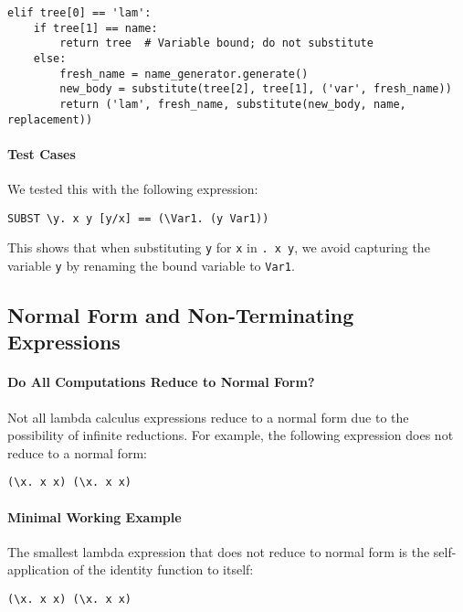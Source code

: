 \begin{verbatim}
elif tree[0] == 'lam':
    if tree[1] == name:
        return tree  # Variable bound; do not substitute
    else:
        fresh_name = name_generator.generate()
        new_body = substitute(tree[2], tree[1], ('var', fresh_name))
        return ('lam', fresh_name, substitute(new_body, name, replacement))
\end{verbatim}

\paragraph{Test Cases}

We tested this with the following expression:

\begin{verbatim}
SUBST \y. x y [y/x] == (\Var1. (y Var1))
\end{verbatim}

This shows that when substituting \texttt{y} for \texttt{x} in \texttt{\y. x y}, we avoid capturing the variable \texttt{y} by renaming the bound variable to \texttt{Var1}.

\subsection{Normal Form and Non-Terminating Expressions}

\paragraph{Do All Computations Reduce to Normal Form?}

Not all lambda calculus expressions reduce to a normal form due to the possibility of infinite reductions. For example, the following expression does not reduce to a normal form:

\begin{verbatim}
(\x. x x) (\x. x x)
\end{verbatim}

\paragraph{Minimal Working Example}

The smallest lambda expression that does not reduce to normal form is the self-application of the identity function to itself:

\begin{verbatim}
(\x. x x) (\x. x x)
\end{verbatim}

